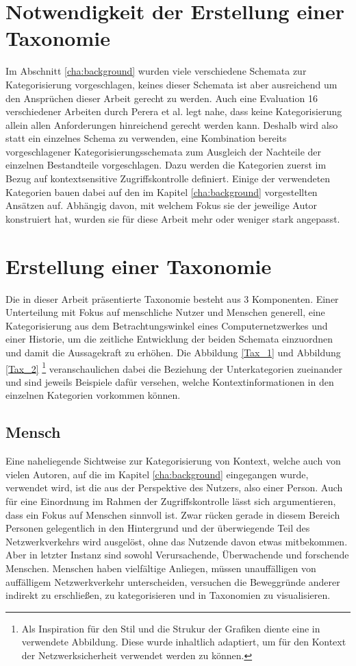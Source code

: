 \section{Notwendigkeit der Erstellung einer Taxonomie }
Im Abschnitt \ref{cha:background} wurden viele verschiedene Schemata zur Kategorisierung vorgeschlagen, keines dieser Schemata ist aber ausreichend um den Ansprüchen dieser Arbeit gerecht zu werden. Auch eine Evaluation 16 verschiedener Arbeiten durch Perera et al. \cite{perera_context_2014} legt nahe, dass keine Kategorisierung allein allen Anforderungen hinreichend gerecht werden kann.
Deshalb wird also statt ein einzelnes Schema zu verwenden, eine Kombination bereits vorgeschlagener Kategorisierungsschemata zum Ausgleich der Nachteile der einzelnen Bestandteile vorgeschlagen. Dazu werden die Kategorien zuerst im Bezug auf kontextsensitive Zugriffskontrolle definiert. Einige der verwendeten Kategorien bauen dabei auf den im Kapitel \ref{cha:background} vorgestellten Ansätzen auf. Abhängig davon, mit welchem Fokus sie der jeweilige Autor konstruiert hat, wurden sie für diese Arbeit mehr oder weniger stark angepasst.
\section{Erstellung einer Taxonomie}
\label{sec:tax_erstellung}
Die in dieser Arbeit präsentierte Taxonomie besteht aus 3 Komponenten. Einer Unterteilung mit Fokus auf menschliche Nutzer und Menschen generell, eine Kategorisierung aus dem Betrachtungswinkel eines Computernetzwerkes und einer Historie, um die zeitliche Entwicklung der beiden Schemata einzuordnen und damit die Aussagekraft zu erhöhen.
Die Abbildung \ref{Tax_1} und Abbildung \ref{Tax_2} \footnote{Als Inspiration für den Stil und die Strukur der Grafiken diente eine in \cite{perera_context_2014} verwendete Abbildung. Diese wurde inhaltlich adaptiert, um für den Kontext der Netzwerksicherheit verwendet werden zu können.}  veranschaulichen dabei die Beziehung der Unterkategorien zueinander und sind jeweils Beispiele dafür versehen, welche Kontextinformationen in den einzelnen Kategorien vorkommen können. 
\subsection{Mensch}
Eine naheliegende Sichtweise zur Kategorisierung von Kontext, welche auch von vielen Autoren, auf die im Kapitel \ref{cha:background} eingegangen wurde, verwendet wird, ist die aus der Perspektive des Nutzers, also einer Person. Auch für eine Einordnung im Rahmen der Zugriffskontrolle lässt sich argumentieren, dass ein Fokus auf Menschen sinnvoll ist. Zwar rücken gerade in diesem Bereich Personen gelegentlich in den Hintergrund und der überwiegende Teil des Netzwerkverkehrs wird ausgelöst, ohne das Nutzende davon etwas mitbekommen. Aber in letzter Instanz sind sowohl Verursachende, Überwachende und forschende Menschen. Menschen haben vielfältige Anliegen, müssen unauffälligen von auffälligem Netzwerkverkehr unterscheiden, versuchen die Beweggründe anderer indirekt zu erschließen, zu kategorisieren und in Taxonomien zu visualisieren.

